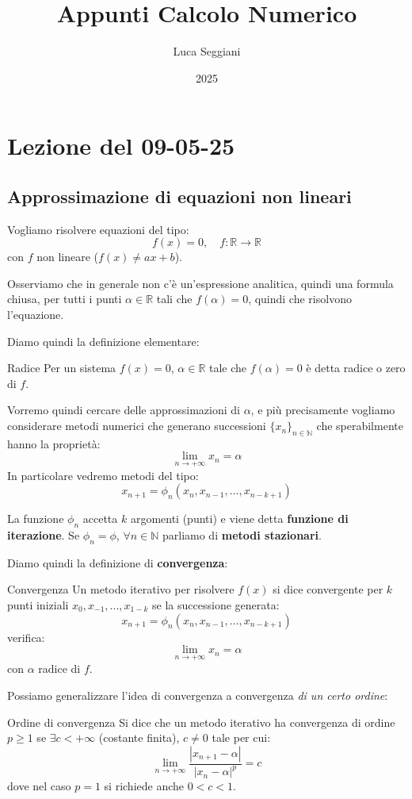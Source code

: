 \documentclass[a4paper,11pt]{article}
\title{Appunti Calcolo Numerico}
\author{Luca Seggiani}
\date{2025}
\begin{document}
\section{Lezione del 09-05-25}

\thispagestyle{empty}
\pagestyle{fancy}

\subsection{Approssimazione di equazioni non lineari}
Vogliamo risolvere equazioni del tipo:
$$
f(x) = 0, \quad f : \mathbb{R} \rightarrow \mathbb{R}
$$
con $f$ non lineare ($f(x) \neq ax + b$).

Osserviamo che in generale non c'è un'espressione analitica, quindi una formula chiusa, per tutti i punti $\alpha \in \mathbb{R}$ tali che $f(\alpha) = 0$, quindi che risolvono l'equazione.

Diamo quindi la definizione elementare:
\begin{definition}{Radice}
	Per un sistema $f(x) = 0$, $\alpha \in \mathbb{R}$ tale che $f(\alpha) = 0$ è detta radice o zero di $f$.
\end{definition}

Vorremo quindi cercare delle approssimazioni di $\alpha$, e più precisamente vogliamo considerare metodi numerici che generano successioni $\{x_n\}_{n \in \mathbb{N}}$ che sperabilmente hanno la proprietà:
$$
\lim_{n \rightarrow + \infty} x_n = \alpha
$$
In particolare vedremo metodi del tipo:
$$
x_{n + 1} = \phi_n (x_n, x_{n - 1}, ..., x_{n - k + 1})
$$

La funzione $\phi_n$ accetta $k$ argomenti (punti) e viene detta \textbf{funzione di iterazione}.
Se $\phi_n = \phi$, $\forall n \in \mathbb{N}$ parliamo di \textbf{metodi stazionari}.

Diamo quindi la definizione di \textbf{convergenza}:
\begin{definition}{Convergenza}
	Un metodo iterativo per risolvere $f(x)$ si dice convergente per $k$ punti iniziali $x_0, x_{-1}, ..., x_{1-k}$ se la successione generata:
	$$
	x_{n + 1} = \phi_n (x_n, x_{n - 1}, ..., x_{n - k + 1})
	$$
	verifica:
	$$
	\lim_{n \rightarrow + \infty} x_n = \alpha
	$$
	con $\alpha$ radice di $f$.
\end{definition}

Possiamo generalizzare l'idea di convergenza a convergenza \textit{di un certo ordine}:
\begin{definition}{Ordine di convergenza}
	Si dice che un metodo iterativo ha convergenza di ordine $p \geq 1$ se $\exists c < +\infty$ (costante finita), $c \neq 0$ tale per cui:
	$$
	\lim_{n \rightarrow +\infty} \frac{|x_{n + 1} - \alpha|}{|x_n - \alpha|^p} = c
	$$
	dove nel caso $p = 1$ si richiede anche $0 < c < 1$.
\end{definition}
\end{document}
